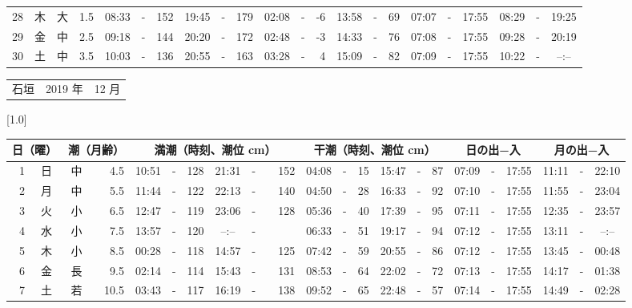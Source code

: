 \documentclass[12pt,a4j]{jsarticle}
\begin{document}
\begin{table}[htbp]
\begin{center}
{\begin{tabular}{|rc|cr|ccrccr|ccrccr|ccc|ccc|}
28 & 木 & 大 &  1.5 &  08:33 &-& 152 &  19:45 &-& 179 &  02:08 &-&  -6 &  13:58 &-&  69 & 07:07 & -& 17:55 & 08:29 & -& 19:25 \\
29 & 金 & 中 &  2.5 &  09:18 &-& 144 &  20:20 &-& 172 &  02:48 &-&  -3 &  14:33 &-&  76 & 07:08 & -& 17:55 & 09:28 & -& 20:19 \\
30 & 土 & 中 &  3.5 &  10:03 &-& 136 &  20:55 &-& 163 &  03:28 &-&   4 &  15:09 &-&  82 & 07:09 & -& 17:55 & 10:22 & -& --:-- \\
   \hline
   \end{tabular}}
   \end{center}
\end{table}
\newpage
 \begin{table}[htbp]
 \begin{center}
 \begin{tabular}{lcc}
 \LARGE{石垣}  & \large{2019 年} & \large{12 月} \\
 \end{tabular}
 \end{center}
 \begin{center}
    \scalebox{0.7}[1.0]{
    \begin{tabular}{|rc|cr|ccrccr|ccrccr|ccc|ccc|}
    \hline
    \multicolumn{2}{|c|}{日（曜）} & \multicolumn{2}{c|}{潮（月齢）} & \multicolumn{6}{c|}{満潮（時刻、潮位 cm）} & \multicolumn{6}{c|}{干潮（時刻、潮位 cm）} & \multicolumn{3}{c|}{日の出−入} &  \multicolumn{3}{c|}{月の出−入}\\
 \hline
 1 & 日 & 中 &  4.5 &  10:51 &-& 128 &  21:31 &-& 152 &  04:08 &-&  15 &  15:47 &-&  87 & 07:09 & -& 17:55 & 11:11 & -& 22:10 \\
 2 & 月 & 中 &  5.5 &  11:44 &-& 122 &  22:13 &-& 140 &  04:50 &-&  28 &  16:33 &-&  92 & 07:10 & -& 17:55 & 11:55 & -& 23:04 \\
 3 & 火 & 小 &  6.5 &  12:47 &-& 119 &  23:06 &-& 128 &  05:36 &-&  40 &  17:39 &-&  95 & 07:11 & -& 17:55 & 12:35 & -& 23:57 \\
 4 & 水 & 小 &  7.5 &  13:57 &-& 120 &  --:-- &-&~~~~~ &  06:33 &-&  51 &  19:17 &-&  94 & 07:12 & -& 17:55 & 13:11 & -& --:-- \\
 5 & 木 & 小 &  8.5 &  00:28 &-& 118 &  14:57 &-& 125 &  07:42 &-&  59 &  20:55 &-&  86 & 07:12 & -& 17:55 & 13:45 & -& 00:48 \\
 6 & 金 & 長 &  9.5 &  02:14 &-& 114 &  15:43 &-& 131 &  08:53 &-&  64 &  22:02 &-&  72 & 07:13 & -& 17:55 & 14:17 & -& 01:38 \\
 7 & 土 & 若 & 10.5 &  03:43 &-& 117 &  16:19 &-& 138 &  09:52 &-&  65 &  22:48 &-&  57 & 07:14 & -& 17:55 & 14:49 & -& 02:28 \\

\end{tabular}}
\end{center}
\end{table}
\end{document}
